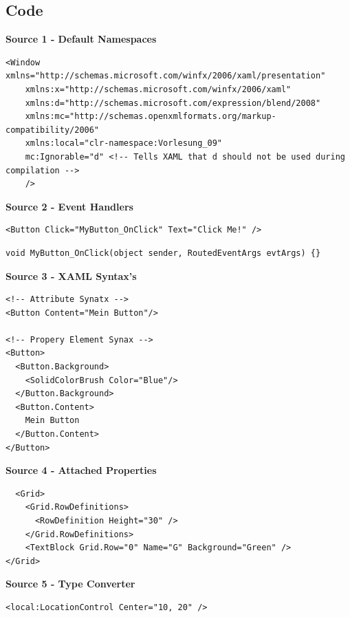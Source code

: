\documentclass[10pt,twoside,landscape]{article}
\begin{document}
\begin{multicols}{2}
\section{Code}
\label{sec:org566124e}
\textbf{Source 1 - Default Namespaces}
\lstset{language=XML,label= ,caption= ,captionpos=b,numbers=none}
\begin{lstlisting}
<Window xmlns="http://schemas.microsoft.com/winfx/2006/xaml/presentation"
	xmlns:x="http://schemas.microsoft.com/winfx/2006/xaml"
	xmlns:d="http://schemas.microsoft.com/expression/blend/2008"
	xmlns:mc="http://schemas.openxmlformats.org/markup-compatibility/2006"
	xmlns:local="clr-namespace:Vorlesung_09"
	mc:Ignorable="d" <!-- Tells XAML that d should not be used during compilation -->
	/>
\end{lstlisting}

\textbf{Source 2 - Event Handlers}
\lstset{language=XML,label= ,caption= ,captionpos=b,numbers=none}
\begin{lstlisting}
<Button Click="MyButton_OnClick" Text="Click Me!" />
\end{lstlisting}

\lstset{language=csharp,label= ,caption= ,captionpos=b,numbers=none}
\begin{lstlisting}
void MyButton_OnClick(object sender, RoutedEventArgs evtArgs) {}
\end{lstlisting}

\textbf{Source 3 - XAML Syntax's}
\lstset{language=XML,label= ,caption= ,captionpos=b,numbers=none}
\begin{lstlisting}
<!-- Attribute Synatx -->
<Button Content="Mein Button"/>

<!-- Propery Element Synax -->
<Button>
  <Button.Background>
    <SolidColorBrush Color="Blue"/>
  </Button.Background>
  <Button.Content>
    Mein Button
  </Button.Content>
</Button>
\end{lstlisting}


\textbf{Source 4 - Attached Properties}
\lstset{language=XML,label= ,caption= ,captionpos=b,numbers=none}
\begin{lstlisting}
  <Grid>
    <Grid.RowDefinitions>
      <RowDefinition Height="30" />
    </Grid.RowDefinitions>
    <TextBlock Grid.Row="0" Name="G" Background="Green" />
</Grid>
\end{lstlisting}

\textbf{Source 5 - Type Converter}
\lstset{language=XML,label= ,caption= ,captionpos=b,numbers=none}
\begin{lstlisting}
<local:LocationControl Center="10, 20" />
\end{lstlisting}


\end{multicols}
\end{document}
